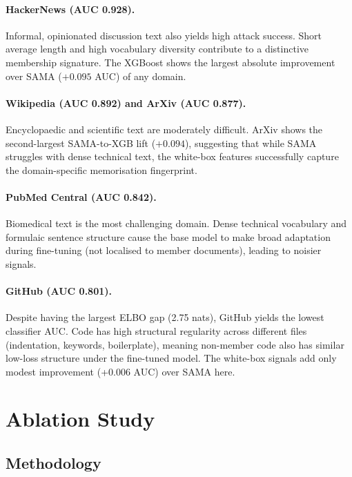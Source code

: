 \documentclass[11pt,a4paper]{article}
\begin{document}
\paragraph{HackerNews (AUC 0.928).}
Informal, opinionated discussion text also yields high attack success.
Short average length and high vocabulary diversity contribute to a distinctive
membership signature. The XGBoost shows the largest absolute improvement
over SAMA ($+0.095$ AUC) of any domain.

\paragraph{Wikipedia (AUC 0.892) and ArXiv (AUC 0.877).}
Encyclopaedic and scientific text are moderately difficult. ArXiv shows the
second-largest SAMA-to-XGB lift ($+0.094$), suggesting that while SAMA
struggles with dense technical text, the white-box features successfully
capture the domain-specific memorisation fingerprint.

\paragraph{PubMed Central (AUC 0.842).}
Biomedical text is the most challenging domain. Dense technical vocabulary
and formulaic sentence structure cause the base model to make broad adaptation
during fine-tuning (not localised to member documents), leading to noisier signals.

\paragraph{GitHub (AUC 0.801).}
Despite having the largest ELBO gap (2.75 nats), GitHub yields the lowest
classifier AUC. Code has high structural regularity across different files
(indentation, keywords, boilerplate), meaning non-member code also has
similar low-loss structure under the fine-tuned model. The white-box signals
add only modest improvement (+0.006 AUC) over SAMA here.

\section{Ablation Study}

\label{sec:ablation}

\subsection{Methodology}
\end{document}
